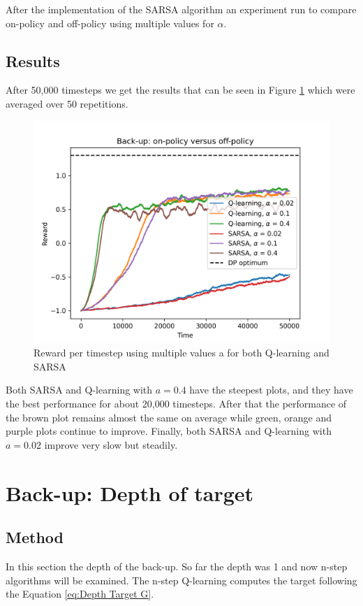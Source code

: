 \documentclass{article}
\begin{document}
After the implementation of the SARSA algorithm an
experiment run  to compare on-policy and off-policy using multiple values for $\alpha$.

\subsection{Results}
After 50,000 timesteps we get the results that can be seen in Figure \ref{fig:SARSA} which were averaged over 50 repetitions.
\begin{figure}[h]
    \centering
    \includegraphics[scale = 0.55]{images/on_off_policy.png}
    \caption{Reward per timestep using multiple values a for both Q-learning and SARSA}
    \label{fig:SARSA}
\end{figure}

Both SARSA and Q-learning with $a = 0.4$ have the steepest plots, and they have the best performance for about 20,000 timesteps. After that the performance of the brown plot remains almost the same on average
while green, orange and purple plots continue to improve. Finally, both SARSA   and Q-learning with $a = 0.02$ improve very slow but steadily.

\section{Back-up: Depth of target}
\subsection{Method}
In this section the depth of the back-up. So far the depth was 1 and now n-step  algorithms  will be examined.
The n-step Q-learning computes the target following the Equation \ref{eq:Depth Target G}.
\end{document}
